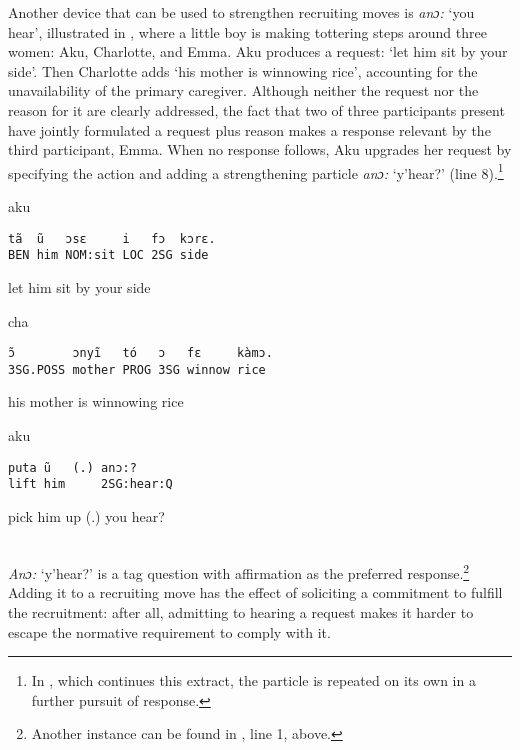 \documentclass[output=paper]{langsci/langscibook}
\begin{document}
Another device that can be used to strengthen recruiting moves is \textit{anɔ:} ‘you hear’, illustrated in , where a little boy is making tottering steps around three women: Aku, Charlotte, and Emma. Aku produces a request: ‘let him sit by your side’. Then Charlotte adds ‘his mother is winnowing rice’, accounting for the unavailability of the primary caregiver. Although neither the request nor the reason for it are clearly addressed, the fact that two of three participants present have jointly formulated a request plus reason makes a response relevant by the third participant, Emma. When no response follows, Aku upgrades her request by specifying the action and adding a strengthening particle \textit{anɔ:} ‘y’hear?’ (line 8).\footnote{In , which continues this extract, the particle is repeated on its own in a further pursuit of response.}

\vspace{2mm} %
%
\begin{transbox}{4}{aku}
\begin{verbatim}
tã  ũ   ɔsɛ     i   fɔ  kɔrɛ.
BEN him NOM:sit LOC 2SG side
\end{verbatim}
 let him sit by your side
\end{transbox}
%
%
\begin{transbox}{6}{cha}
\begin{verbatim}
ɔ̃        ɔnyĩ   tó   ɔ   fɛ     kàmɔ.
3SG.POSS mother PROG 3SG winnow rice
\end{verbatim}
his mother is winnowing rice
\end{transbox}
%
%
\begin{mdframednoverticalspace}[style=firstfoc]
\begin{transbox}{8}{aku}
\begin{verbatim}
puta ũ   (.) anɔ:?
lift him     2SG:hear:Q
\end{verbatim}
 pick him up (.) you hear?
\end{transbox}
\end{mdframednoverticalspace}
%
\vspace{-1.5mm}
%
\\

\normalsize
\textit{Anɔ:} ‘y’hear?’ is a tag question with affirmation as the preferred response.\footnote{Another instance can be found in , line 1, above.} Adding it to a recruiting move has the effect of soliciting a commitment to fulfill the recruitment: after all, admitting to hearing a request makes it harder to escape the normative requirement to comply with it.
\end{document}
